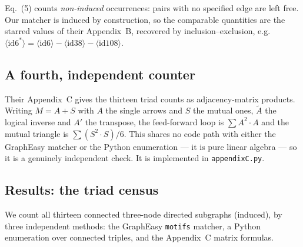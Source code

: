 \documentclass[11pt]{article}
\begin{document}
Eq.~(5) counts \emph{non-induced} occurrences: pairs with no specified edge are
left free. Our matcher is induced by construction, so the comparable quantities
are the starred values of their Appendix~B, recovered by inclusion--exclusion,
e.g.\ $\langle \mathrm{id}6^{*}\rangle=\langle \mathrm{id}6\rangle-\langle
\mathrm{id}38\rangle-\langle \mathrm{id}108\rangle$.

\subsection{A fourth, independent counter}

Their Appendix~C gives the thirteen triad counts as adjacency-matrix products.
Writing $M=A+S$ with $A$ the single arrows and $S$ the mutual ones, $\tilde{A}$
the logical inverse and $A'$ the transpose, the feed-forward loop is
$\sum A^{2}\!\cdot\!A$ and the mutual triangle is $\sum (S^{2}\!\cdot\!S)/6$.
This shares no code path with either the GraphEasy matcher or the Python
enumeration --- it is pure linear algebra --- so it is a genuinely independent
check. It is implemented in \texttt{appendixC.py}.

\subsection{Results: the triad census}

We count all thirteen connected three-node directed subgraphs (induced), by
three independent methods: the GraphEasy \texttt{motifs} matcher, a Python
enumeration over connected triples, and the Appendix~C matrix formulas.
\end{document}
